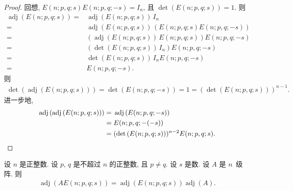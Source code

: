 \documentclass[../libro.tex]{subfiles}
\begin{document}
\begin{proof}
    回想, \(E(n; p, q; s) E(n; p, q; -s) = I_n\),
    且 \(\det {(E(n; p, q; s))} = 1\).
    则
    \begin{align*}
        \operatorname{adj} {(E(n; p, q; s))}
        = {} &
        \operatorname{adj} {(E(n; p, q; s))}\, I_n
        \\
        = {} &
        \operatorname{adj} {(E(n; p, q; s))}\, (E(n; p, q; s) E(n; p, q; -s))
        \\
        = {} &
        (\operatorname{adj} {(E(n; p, q; s))}\, E(n; p, q; s)) E(n; p, q; -s)
        \\
        = {} &
        (\det {(E(n; p, q; s))}\, I_n)
        E(n; p, q; -s)
        \\
        = {} &
        \det {(E(n; p, q; s))}\, I_n E(n; p, q; -s)
        \\
        = {} &
        E(n; p, q; -s).
    \end{align*}
    则
    \begin{align*}
        \det {(\operatorname{adj} {(E(n; p, q; s))})}
        = \det {(E(n; p, q; -s))}
        = 1
        = (\det {(E(n; p, q; s))})^{n-1}.
    \end{align*}
    进一步地,
    \begin{align*}
        \operatorname{adj} {(
                \operatorname{adj} {(E(n; p, q; s))}
        )}
        = {} &
        \operatorname{adj} {(E(n; p, q; -s))}
        \\
        = {} &
        E(n; p, q; -(-s))
        \\
        = {} &
        (\det {(E(n; p, q; s))})^{n-2}
        E(n; p, q; s).
        \qedhere
    \end{align*}
\end{proof}

\begin{theorem}
    设 \(n\) 是正整数.
    设 \(p\), \(q\) 是不超过 \(n\) 的正整数, 且 \(p \neq q\).
    设 \(s\) 是数.
    设 \(A\) 是 \(n\)~级阵.
    则
    \begin{align*}
        \operatorname{adj} {(A E(n; p, q; s))}
        =
        \operatorname{adj} {(E(n; p, q; s))}
        \operatorname{adj} {(A)}.
    \end{align*}
\end{theorem}
\end{document}
